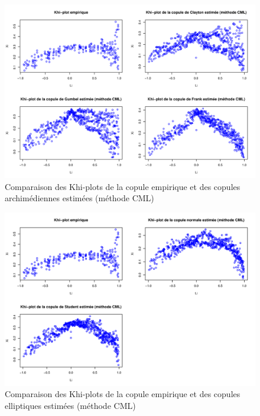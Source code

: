 \noindent%
\begin{figure}[H]
    \begin{center}
      \includegraphics[width=17 cm, angle=0]{./pictures/archcmlkhiplot.png}
      \centering\caption{\label{2}Comparaison des Khi-plots de la copule empirique et des copules archimédiennes estimées (méthode CML)}
    \end{center}
\end{figure}

\noindent%
\begin{figure}[H]
    \begin{center}
      \includegraphics[width=17 cm, angle=0]{./pictures/ellipcmlkhiplot.png}
      \centering\caption{\label{2}Comparaison des Khi-plots de la copule empirique et des copules elliptiques estimées (méthode CML)}
    \end{center}
\end{figure}

